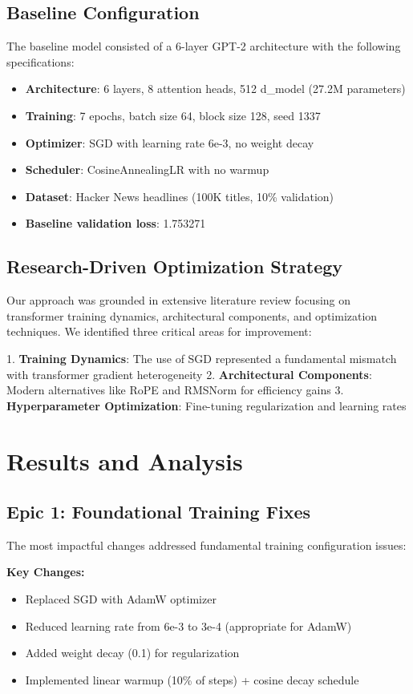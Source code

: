 \documentclass[11pt,a4paper]{article}
\begin{document}
\subsection{Baseline Configuration}
The baseline model consisted of a 6-layer GPT-2 architecture with the following specifications:
\begin{itemize}
    \item \textbf{Architecture}: 6 layers, 8 attention heads, 512 d\_model (27.2M parameters)
    \item \textbf{Training}: 7 epochs, batch size 64, block size 128, seed 1337
    \item \textbf{Optimizer}: SGD with learning rate 6e-3, no weight decay
    \item \textbf{Scheduler}: CosineAnnealingLR with no warmup
    \item \textbf{Dataset}: Hacker News headlines (100K titles, 10\% validation)
    \item \textbf{Baseline validation loss}: 1.753271
\end{itemize}

\subsection{Research-Driven Optimization Strategy}
Our approach was grounded in extensive literature review focusing on transformer training dynamics, architectural components, and optimization techniques. We identified three critical areas for improvement:

1. \textbf{Training Dynamics}: The use of SGD represented a fundamental mismatch with transformer gradient heterogeneity
2. \textbf{Architectural Components}: Modern alternatives like RoPE and RMSNorm for efficiency gains
3. \textbf{Hyperparameter Optimization}: Fine-tuning regularization and learning rates

\section{Results and Analysis}

\subsection{Epic 1: Foundational Training Fixes}
The most impactful changes addressed fundamental training configuration issues:

\textbf{Key Changes:}
\begin{itemize}
    \item Replaced SGD with AdamW optimizer
    \item Reduced learning rate from 6e-3 to 3e-4 (appropriate for AdamW)
    \item Added weight decay (0.1) for regularization
    \item Implemented linear warmup (10\% of steps) + cosine decay schedule
\end{itemize}
\end{document}
